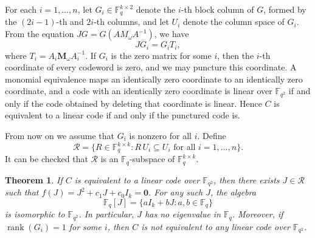 \documentclass[a4paper,12pt]{article}
\theoremstyle{plain}
\newtheorem{theorem}[lemma]{Theorem}
\theoremstyle{definition}
\begin{document}
For each $i = 1, \dots, n$, let $G_i \in \mathbb{F}_q^{k \times 2}$ denote the $i$-th block column of $G$, formed by the $(2i{-}1)$-th and $2i$-th columns, and let $U_i$ denote the column space of $G_i$.
From the equation $JG = G(AM_\omega A^{-1})$, we have
\[
J G_i = G_i T_i,
\]
where $T_i = A_i \mathbf{M}_\omega A_i^{-1}$. 
If $G_i$ is the zero matrix for some $i$, then the $i$-th coordinate of every codeword is zero, and we may puncture this coordinate. 
A monomial equivalence maps an identically zero coordinate to an identically zero coordinate, and a code with an identically zero coordinate is linear over $\mathbb{F}_{q^2}$ if and only if the code obtained by deleting that coordinate is linear. Hence $C$ is equivalent to a linear code if and only if the punctured code is.


From now on we assume that $G_i$ is nonzero for all $i$.
Define
$$
\mathcal{R} = \{ R \in \mathbb{F}_{q}^{k \times k} : R\, U_i \subseteq U_i \text{ for all } i = 1, \dots, n \}.
$$
It can be checked that $\mathcal{R}$ is an $\mathbb{F}_q$-subspace of $\mathbb{F}_{q}^{k \times k}$. 
 
\begin{theorem}\label{eigenvalue} 
If $C$ is equivalent to a linear code over $\mathbb{F}_{q^2}$, then there exists $J \in \mathcal{R}$ such that $f(J) = J^2 + c_1 J + c_0 I_k = \mathbf{0}$. 
For any such $J$, the algebra 
\[
\mathbb{F}_q[J] = \{aI_k + bJ : a, b \in \mathbb{F}_q\}
\]
is isomorphic to $\mathbb{F}_{q^2}$. 
In particular, $J$ has no eigenvalue in $\mathbb{F}_q$.
Moreover, if $\operatorname{rank}(G_i) = 1$ for some $i$, then $C$ is not equivalent to any linear code over $\mathbb{F}_{q^2}$.
\end{theorem}
 
\end{document}
